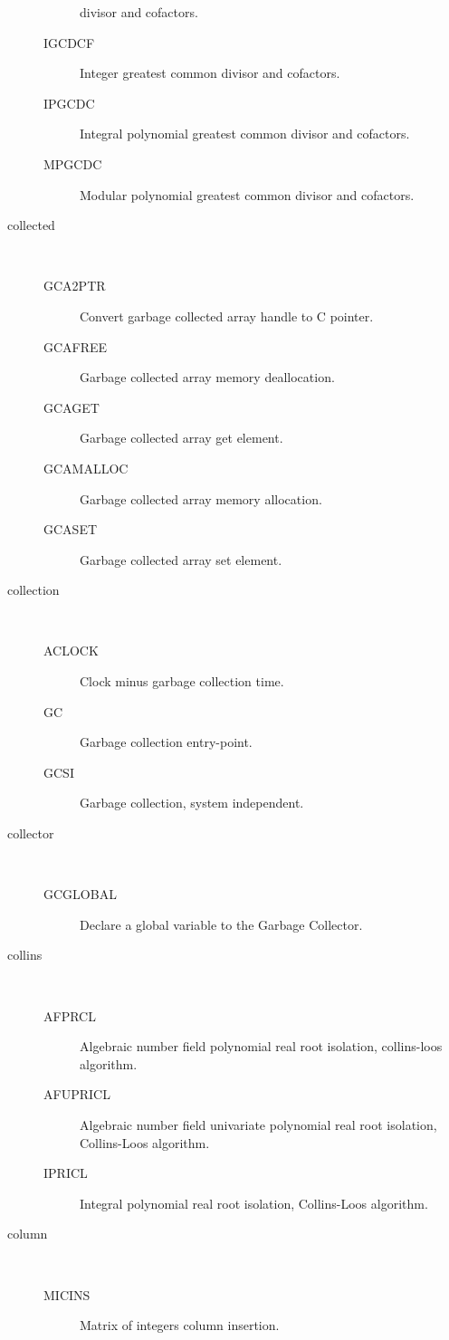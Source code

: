\begin{description}
\begin{description}
    divisor and cofactors.
  \item[IGCDCF]  Integer greatest common divisor and cofactors.
  \item[IPGCDC]  Integral polynomial greatest common divisor and cofactors.
  \item[MPGCDC]  Modular polynomial greatest common divisor and cofactors.
  \end{description}
\item[collected] \ \ 
  \begin{description}
  \item[GCA2PTR]  Convert garbage collected array handle to C pointer.
  \item[GCAFREE]  Garbage collected array memory deallocation.
  \item[GCAGET]  Garbage collected array get element.
  \item[GCAMALLOC]  Garbage collected array memory allocation.
  \item[GCASET]  Garbage collected array set element.
  \end{description}
\item[collection] \ \ 
  \begin{description}
  \item[ACLOCK]  Clock minus garbage collection time.
  \item[GC]  Garbage collection entry-point.
  \item[GCSI]  Garbage collection, system independent.
  \end{description}
\item[collector] \ \ 
  \begin{description}
  \item[GCGLOBAL]  Declare a global variable to the Garbage Collector.
  \end{description}
\item[collins] \ \ 
  \begin{description}
  \item[AFPRCL]  Algebraic number field polynomial real root isolation,
    collins-loos algorithm.
  \item[AFUPRICL]  Algebraic number field univariate polynomial real root
    isolation, Collins-Loos algorithm.
  \item[IPRICL]  Integral polynomial real root isolation, Collins-Loos
    algorithm.
  \end{description}
\item[column] \ \ 
  \begin{description}
  \item[MICINS]  Matrix of integers column insertion.

\end{description}
\end{description}
